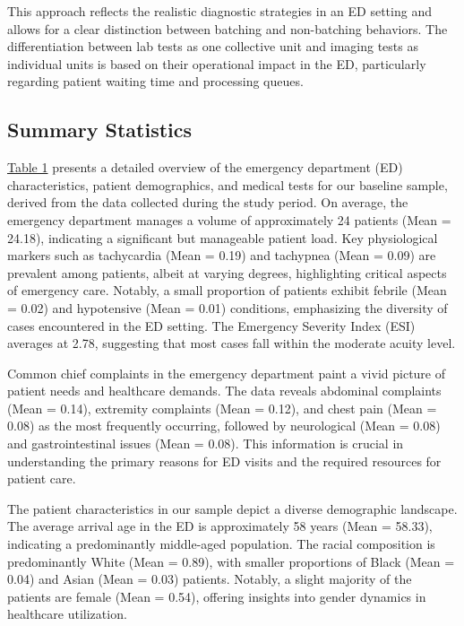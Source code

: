 \documentclass[,,nonblindrev]{informs}
\begin{document}
This approach reflects the realistic diagnostic strategies in an ED
setting and allows for a clear distinction between batching and
non-batching behaviors. The differentiation between lab tests as one
collective unit and imaging tests as individual units is based on their
operational impact in the ED, particularly regarding patient waiting
time and processing queues.

\hypertarget{summary-statistics}{%
\subsection{Summary Statistics}\label{summary-statistics}}

\hyperref[tab:summary_statistics]{Table 1} presents a detailed overview
of the emergency department (ED) characteristics, patient demographics,
and medical tests for our baseline sample, derived from the data
collected during the study period. On average, the emergency department
manages a volume of approximately 24 patients (Mean = 24.18), indicating
a significant but manageable patient load. Key physiological markers
such as tachycardia (Mean = 0.19) and tachypnea (Mean = 0.09) are
prevalent among patients, albeit at varying degrees, highlighting
critical aspects of emergency care. Notably, a small proportion of
patients exhibit febrile (Mean = 0.02) and hypotensive (Mean = 0.01)
conditions, emphasizing the diversity of cases encountered in the ED
setting. The Emergency Severity Index (ESI) averages at 2.78, suggesting
that most cases fall within the moderate acuity level.

Common chief complaints in the emergency department paint a vivid
picture of patient needs and healthcare demands. The data reveals
abdominal complaints (Mean = 0.14), extremity complaints (Mean = 0.12),
and chest pain (Mean = 0.08) as the most frequently occurring, followed
by neurological (Mean = 0.08) and gastrointestinal issues (Mean = 0.08).
This information is crucial in understanding the primary reasons for ED
visits and the required resources for patient care.

The patient characteristics in our sample depict a diverse demographic
landscape. The average arrival age in the ED is approximately 58 years
(Mean = 58.33), indicating a predominantly middle-aged population. The
racial composition is predominantly White (Mean = 0.89), with smaller
proportions of Black (Mean = 0.04) and Asian (Mean = 0.03) patients.
Notably, a slight majority of the patients are female (Mean = 0.54),
offering insights into gender dynamics in healthcare utilization.
\end{document}
